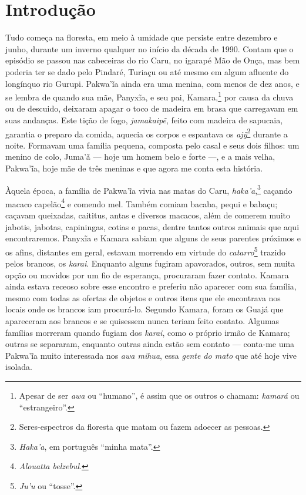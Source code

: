 \chapter{Introdução}
\pagestyle{plain}


Tudo começa na floresta, em meio à umidade que persiste entre dezembro e
junho, durante um inverno qualquer no início da década de 1990. Contam
que o episódio se passou nas cabeceiras do rio Caru, no igarapé
Mão de Onça, mas bem poderia ter se dado pelo Pindaré, Turiaçu ou até
mesmo em algum afluente do longínquo rio Gurupi. Pakwa'ĩa ainda era uma
menina, com menos de dez anos, e se lembra de quando sua mãe, Panyxĩa, e
seu pai, Kamara,\footnote{Apesar de ser \textit{awa} ou ``humano'', é assim que
os outros o chamam: \textit{kamará} ou ``estrangeiro''.} por causa da chuva ou
de descuido, deixaram apagar o toco de madeira em brasa que carregavam
em suas andanças. Este tição de fogo, \textit{jamakaipẽ}, feito com
madeira de sapucaia, garantia o preparo da comida, aquecia os corpos e
espantava os \textit{ajỹ}\footnote{Seres-espectros da floresta que matam ou fazem
adoecer as pessoas.} durante a noite. Formavam uma família pequena,
composta pelo casal e seus dois filhos: um menino de colo, Juma'ã --- hoje
um homem belo e forte ---, e a mais velha, Pakwa'ĩa, hoje mãe de três
meninas e que agora me conta esta história.

Àquela época, a família de Pakwa'ĩa vivia nas matas do Caru,
\textit{haka'a},\footnote{\textit{Haka'a}, em português ``minha mata''.} caçando macaco capelão\footnote{\textit{Alouatta
belzebul}.} e comendo mel. Também comiam bacaba, pequi e babaçu; caçavam
queixadas, caititus, antas e diversos macacos, além de comerem muito
jabotis, jabotas, capiningas, cotias e pacas, dentre tantos outros
animais que aqui encontraremos. Panyxĩa e Kamara sabiam que alguns de
seus parentes próximos e os afins, distantes em geral, estavam morrendo
em virtude do \textit{catarro}\footnote{\textit{Ju'u} ou ``tosse''.} trazido pelos
brancos, os \textit{karai}. Enquanto alguns fugiram apavorados,
outros, sem muita opção ou movidos por um fio de esperança, procuraram
fazer contato. Kamara ainda estava receoso sobre esse encontro e
preferiu não aparecer com sua família, mesmo com todas as ofertas de
objetos e outros itens que ele encontrava nos locais onde os
brancos iam procurá-lo. Segundo Kamara, foram os Guajá que
apareceram aos brancos e se quisessem nunca teriam feito contato. Algumas famílias morreram quando fugiam dos \textit{karai}, como
o próprio irmão de Kamara; outras se separaram, enquanto outras ainda
estão sem contato --- conta-me uma Pakwa'ĩa muito interessada nos
\textit{awa mihua}, essa \textit{gente do mato} que até hoje vive isolada.

